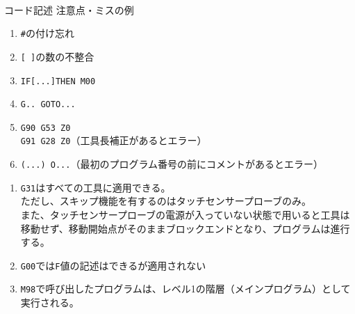 \begin{appendices}
\clearpage
~\vfill
\begin{Column}{コード記述 注意点・ミスの例}
\begin{enumerate}
\item \verb|#|\hx の付け忘れ
\item \verb|[ ]|の数の不整合
\item \verb|IF[...]THEN M00|
\item \verb|G.. GOTO...|
\item \verb|G90 G53 Z0|\\
      \verb|G91 G28 Z0|（工具長補正があるとエラー）
\item \verb|(...) O...|（最初のプログラム番号の前にコメントがあるとエラー）
\end{enumerate}
\tcbline*
\begin{enumerate}
\item
\verb|G31|はすべての工具に適用できる。\\
ただし、スキップ機能を有するのはタッチセンサープローブのみ。\\
また、タッチセンサープローブの電源が入っていない状態で用いると工具は移動せず、移動開始点がそのままブロックエンドとなり、プログラムは進行する。
\item \verb|G00|では\verb|F|値の記述はできるが適用されない
\item \verb|M98|で呼び出したプログラムは、レベル1の階層（メインプログラム）として実行される。
\end{enumerate}
\end{Column}


\end{appendices}
\clearrightpage